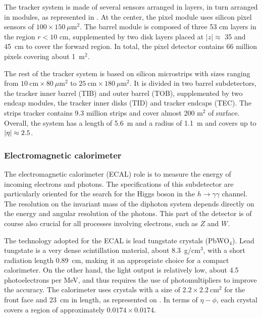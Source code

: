         The tracker system is made of several sensors arranged in layers, in turn arranged
        in modules, as represented in . At the center, the pixel module
        uses silicon pixel sensors of $100 \times 150~\mu$m$^2$. The barrel module
        is composed of three 53 cm layers in the region $r < 10$ cm, supplemented by two
        disk layers placed at $\left|z\right| \approx$ 35 and 45~cm to cover the forward
        region. In total, the pixel detector contains 66 million pixels covering about 1~m$^2$.

        The rest of the tracker system is based on silicon microstrips with sizes ranging
        from $10~\text{cm} \times 80~\mu\text{m}^2$ to $25~\text{cm} \times 180~\mu\text{m}^2$.
        It is divided in two barrel subdetectors, the tracker inner barrel (TIB) and outer barrel (TOB),
        supplemented by two endcap modules, the tracker inner disks (TID) and tracker endcaps
        (TEC). The strips tracker contains 9.3 million strips and cover almost 200 m$^2$ of
        surface. Overall, the system has a length of 5.6~m and a radius of 1.1~m and covers
        up to $\left| \eta \right| \approx 2.5$.

            \subsubsection{Electromagnetic calorimeter}

        The electromagnetic calorimeter (ECAL) role is to measure the energy of incoming electrons
        and photons. The specifications of this subdetector are particularly oriented for
        the search for the Higgs boson in the $h \rightarrow \gamma \gamma$ channel. The resolution on the
        invariant mass of the diphoton system depends directly on the energy and angular
        resolution of the photons. This part of the detector is of course also crucial for
        all processes involving electrons, such as $Z$ and $W$.

        The technology adopted for the ECAL is lead tungstate crystals (PbWO$_4$). Lead
        tungstate is a very dense scintillation material, about 8.3~g/cm$^3$, with a short
        radiation length 0.89~cm, making it an appropriate choice for a compact calorimeter.
        On the other hand, the light output is relatively low, about 4.5 photoelectrons
        per MeV, and thus requires the use of photomultipliers to improve the accuracy.
        The calorimeter uses crystals with a size of $2.2\times2.2~\text{cm}^2$
        for the front face and 23~cm in length, as represented on .
        In terms of $\eta-\phi$, each crystal covers a region of approximately $0.0174
        \times 0.0174$.


